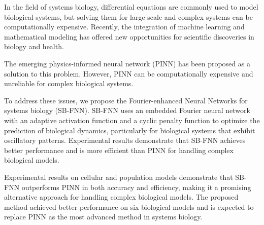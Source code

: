 

In the field of systems biology, differential equations are commonly used to model biological systems, but solving them for large-scale and complex systems can be computationally expensive. Recently, the integration of machine learning and mathematical modeling has offered new opportunities for scientific discoveries in biology and health.

The emerging physics-informed neural network (PINN) has been proposed as a solution to this problem. However, PINN can be computationally expensive and unreliable for complex biological systems.

To address these issues, we propose the Fourier-enhanced Neural Networks for systems biology (SB-FNN). SB-FNN uses an embedded Fourier neural network with an adaptive activation function and a cyclic penalty function to optimize the prediction of biological dynamics, particularly for biological systems that exhibit oscillatory patterns. Experimental results demonstrate that SB-FNN achieves better performance and is more efficient than PINN for handling complex biological models.


Experimental results on cellular and population models demonstrate that SB-FNN outperforms PINN in both accuracy and efficiency, making it a promising alternative approach for handling complex biological models. The proposed method achieved better performance on six biological models and is expected to replace PINN as the most advanced method in systems biology.


